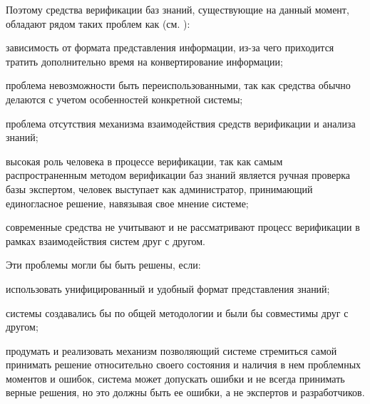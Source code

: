 Поэтому средства верификации баз знаний, существующие на данный момент, обладают рядом таких проблем как (см. ):
\begin{textitemize}
    \item зависимость от формата представления информации, из-за чего приходится тратить дополнительно время на конвертирование информации;
    \item проблема невозможности быть переиспользованными, так как средства обычно делаются с учетом особенностей конкретной системы;
    \item проблема отсутствия механизма взаимодействия средств верификации и анализа знаний;
    \item высокая роль человека в процессе верификации, так как самым распространенным методом верификации баз знаний является ручная проверка базы экспертом, человек выступает как администратор, принимающий единогласное решение, навязывая свое мнение системе;
    \item современные средства не учитывают и не рассматривают процесс верификации в рамках взаимодействия систем друг с другом.
\end{textitemize}

Эти проблемы могли бы быть решены, если:
\begin{textitemize}
    \item использовать унифицированный и удобный формат представления знаний;
    \item системы создавались бы по общей методологии и были бы совместимы друг с другом;
    \item продумать и реализовать механизм позволяющий системе стремиться самой принимать решение относительно своего состояния и наличия в нем проблемных моментов и ошибок, система может допускать ошибки и не всегда принимать верные решения, но это должны быть ее ошибки, а не экспертов и разработчиков.
\end{textitemize}

